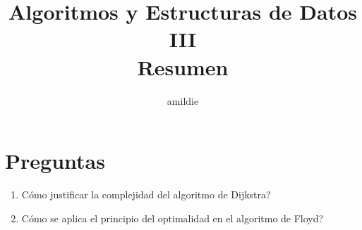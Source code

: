 \documentclass[10pt, a4paper]{article}
\title{Algoritmos y Estructuras de Datos III\\Resumen}
\author{amildie}
\date{\vspace{-5ex}}
\begin{document}
\renewcommand*\contentsname{\empty}

\maketitle
\tableofcontents















\newpage
\section{Preguntas}
\begin{enumerate}
\item C\'omo justificar la complejidad del algoritmo de Dijkstra?
\item C\'omo se aplica el principio del optimalidad en el algoritmo de Floyd?
\end{enumerate}
\end{document}
